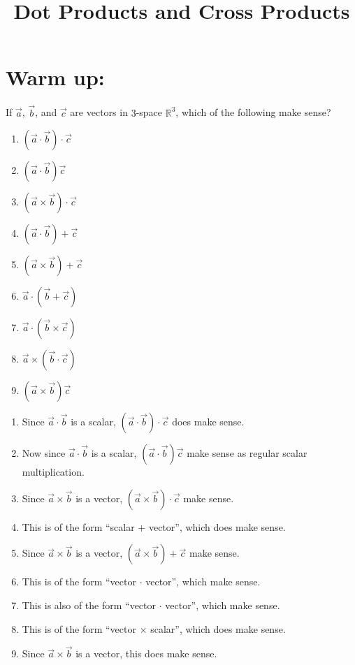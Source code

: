 \documentclass[noinstructornotes]{ximera}
\title{Dot Products and Cross Products}
\begin{document}
\begin{abstract}		\end{abstract}
\maketitle



\section{Warm up:}



If $\vec{a}$, $\vec{b}$, and $\vec{c}$ are vectors in $3$-space $\mathbb{R}^3$, which of the following make sense?
	\begin{multicols}{3}
	\begin{enumerate}
	\item  $(\vec{a} \cdot \vec{b}) \cdot \vec{c}$
	\item  $(\vec{a} \cdot \vec{b})\vec{c}$
	\item  $(\vec{a} \times \vec{b}) \cdot \vec{c}$
	\item  $(\vec{a} \cdot \vec{b}) + \vec{c}$
	\item  $(\vec{a} \times \vec{b}) + \vec{c}$
	\item  $\vec{a} \cdot (\vec{b} + \vec{c})$
	\item  $\vec{a} \cdot (\vec{b} \times \vec{c})$
	\item  $\vec{a} \times (\vec{b} \cdot \vec{c})$
	\item  $(\vec{a} \times \vec{b}) \vec{c}$
	\end{enumerate}
	\end{multicols}
	
	\begin{freeResponse}
	\begin{enumerate}
	\item  Since $\vec{a} \cdot \vec{b}$ is a scalar, $(\vec{a} \cdot \vec{b}) \cdot \vec{c}$ does  make sense.
	\item  Now since $\vec{a} \cdot \vec{b}$ is a scalar, $(\vec{a} \cdot \vec{b})\vec{c}$  make sense as regular scalar multiplication.
	\item  Since $\vec{a} \times \vec{b}$ is a vector, $(\vec{a} \times \vec{b}) \cdot \vec{c}$  make sense.
	\item  This is of the form ``scalar + vector'', which does  make sense.
	\item  Since $\vec{a} \times \vec{b}$ is a vector, $(\vec{a} \times \vec{b}) + \vec{c}$  make sense.
	\item  This is of the form ``vector $\cdot$ vector'', which  make sense.
	\item  This is also of the form ``vector $\cdot$ vector'', which  make sense.
	\item  This is of the form ``vector $\times$ scalar'', which does  make sense.
	\item  Since $\vec{a} \times \vec{b}$ is a vector, this does  make sense.
	\end{enumerate}
	\end{freeResponse}
	
\end{document}
